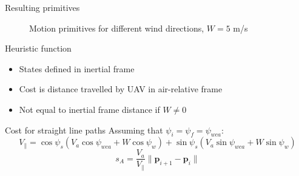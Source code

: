 \documentclass{beamer}
\renewcommand{\vec}[1]{
    \boldsymbol{#1}
}
\begin{document}
\begin{frame}{Resulting primitives}
    \begin{figure}
        \begin{center}
        \end{center}
        \caption{Motion primitives for different wind directions, $W=5$ m/s}
        \label{fig:motion_prims}
    \end{figure}
\end{frame}

\begin{frame}{Heuristic function}
    \begin{itemize}
        \item States defined in inertial frame
        \item Cost is distance travelled by UAV in air-relative frame
        \item Not equal to inertial frame distance if $W\neq0$
    \end{itemize}
\end{frame}

\begin{frame}{Cost for straight line paths}
    Assuming that $\psi_i=\psi_f=\psi_{wca}$:
    \begin{equation}
        V_{\parallel}=\cos\psi_s(V_a\cos\psi_{wca}+W\cos\psi_w) + \sin\psi_s(V_a\sin\psi_{wca}+W\sin\psi_w)
    \end{equation}
    \begin{equation}
        s_A=\frac{V_a}{V_\parallel}\|\vec{p}_{i+1}-\vec{p}_{i}\|
    \end{equation}
\end{frame}
\end{document}
